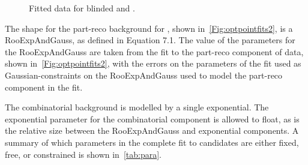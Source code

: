 
\begin{figure}[!ht]\def\nh{0.3\textwidth}
  \centering
    \caption{Fitted data for blinded \Lbpi \protect{} and \LbK \protect{}.}
  \label{Fig:optpointfits2}
\end{figure}


The shape for the part-reco background for \Lbpi, shown in~\autoref{Fig:optpointfits2}\protect{}, is a RooExpAndGauss, as defined in Equation 7.1. The value of the parameters for the RooExpAndGauss are taken from the fit to the part-reco component of \LbK data, shown in~\autoref{Fig:optpointfits2}\protect{}, with the errors on the parameters of the \LbK fit used as Gaussian-constraints on the RooExpAndGauss used to model the part-reco component in the \Lbpi fit. %

The combinatorial background is modelled by a single exponential. The exponential parameter for the combinatorial component is allowed to float, as is the relative size between the RooExpAndGauss and exponential components. A summary of which parameters in the complete fit to \Lbpi candidates are either fixed, free, or constrained is shown in~\autoref{tab:para}. %

